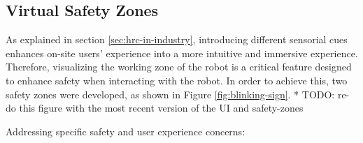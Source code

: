     
\subsection{Virtual Safety Zones}
\label{subsection:virtual-safety-zones} 

As explained in section \ref{sec:hrc-in-industry}, introducing different sensorial cues enhances on-site users' experience into a more intuitive and immersive experience. Therefore, visualizing the working zone of the robot is a critical feature designed to enhance safety when interacting with the robot. In order to achieve this, two safety zones were developed, as shown in Figure \ref{fig:blinking-sign}. 
* TODO: re-do this figure with the most recent version of the UI and safety-zones


Addressing specific safety and user experience concerns: 

